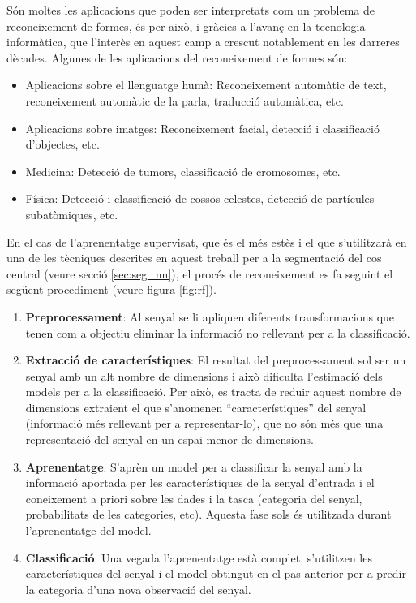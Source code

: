 Són moltes les aplicacions que poden ser interpretats com un problema de reconeixement de formes, és per això, i gràcies a l'avanç en la tecnologia informàtica, que l'interès en aquest camp a crescut notablement en les darreres dècades. Algunes de les aplicacions del reconeixement de formes són:
\begin{itemize}
\item Aplicacions sobre el llenguatge humà: Reconeixement automàtic de text, reconeixement automàtic de la parla, traducció automàtica, etc.
\item Aplicacions sobre imatges: Reconeixement facial, detecció i classificació d'objectes, etc.
\item Medicina: Detecció de tumors, classificació de cromosomes, etc.
\item Física: Detecció i classificació de cossos celestes, detecció de partícules subatòmiques, etc.
\end{itemize}

En el cas de l'aprenentatge supervisat, que és el més estès i el que s'utilitzarà en una de les tècniques descrites en aquest treball per a la segmentació del cos central (veure secció \ref{sec:seg_nn}), el procés de reconeixement es fa seguint el següent procediment (veure figura \ref{fig:rf}).

\begin{enumerate}
\item \textbf{Preprocessament}: Al senyal se li apliquen diferents transformacions que tenen com a objectiu eliminar la informació no rellevant per a la classificació.
\item \textbf{Extracció de característiques}: El resultat del preprocessament sol ser un senyal amb un alt nombre de dimensions i això dificulta l'estimació dels models per a la classificació. Per això, es tracta de reduir aquest nombre de dimensions extraient el que s'anomenen ``característiques'' del senyal (informació més rellevant per a representar-lo), que no són més que una representació del senyal en un espai menor de dimensions.
\item \textbf{Aprenentatge}: S'aprèn un model per a classificar la senyal amb la informació aportada per les característiques de la senyal d'entrada i el coneixement a priori sobre les dades i la tasca (categoria del senyal, probabilitats de les categories, etc). Aquesta fase sols és utilitzada durant l'aprenentatge del model.
\item \textbf{Classificació}: Una vegada l'aprenentatge està complet, s'utilitzen les característiques del senyal i el model obtingut en el pas anterior per a predir la categoria d'una nova observació del senyal.
\end{enumerate}

